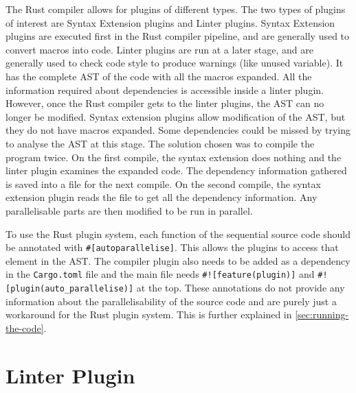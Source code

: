 The Rust compiler allows for plugins of different types. The two types of plugins of interest are Syntax Extension plugins and Linter plugins. Syntax Extension plugins are executed first in the Rust compiler pipeline, and are generally used to convert macros into code. Linter plugins are run at a later stage, and are generally used to check code style to produce warnings (like unused variable). It has the complete AST of the code with all the macros expanded. All the information required about dependencies is accessible inside a linter plugin. However, once the Rust compiler gets to the linter plugins, the AST can no longer be modified. Syntax extension plugins allow modification of the AST, but they do not have macros expanded. Some dependencies could be missed by trying to analyse the AST at this stage. The solution chosen was to compile the program twice. On the first compile, the syntax extension does nothing and the linter plugin examines the expanded code. The dependency information gathered is saved into a file for the next compile. On the second compile, the syntax extension plugin reads the file to get all the dependency information. Any parallelisable parts are then modified to be run in parallel.

To use the Rust plugin system, each function of the sequential source code should be annotated with \texttt{\#[autoparallelise]}. This allows the plugins to access that element in the AST. The compiler plugin also needs to be added as a dependency in the \texttt{Cargo.toml} file and the main file needs \texttt{\#![feature(plugin)]} and \texttt{\#![plugin(auto\_parallelise)]} at the top. These annotations do not provide any information about the parallelisability of the source code and are purely just a workaround for the Rust plugin system. This is further explained in \autoref{sec:running-the-code}.

\section{Linter Plugin}

